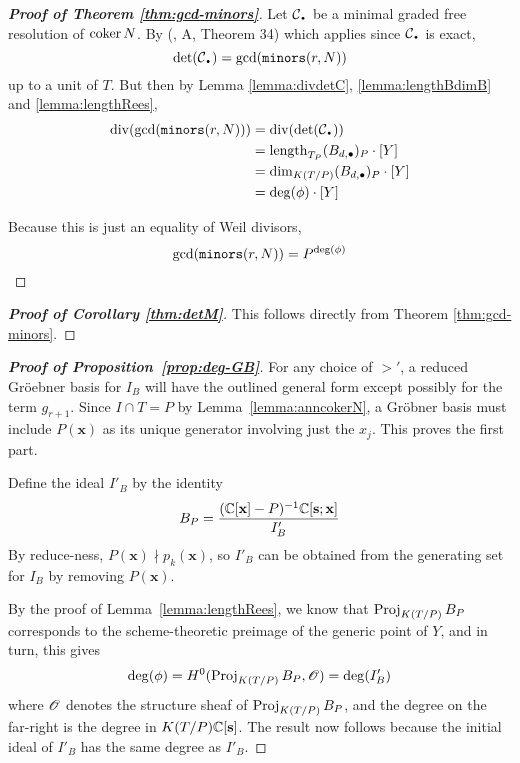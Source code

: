 \documentclass[fleqn,reqno]{amsart}
\begin{document}
\begin{proof}[\bf Proof of Theorem \ref{thm:gcd-minors}]
Let $\mathcal{C}_\nbul$ be a minimal graded free resolution of $\operatorname{coker} N$.
By (\citet{GKZ94}, A, Theorem 34) which applies since $\mathcal{C}_\nbul$ is exact,
\[
	\det(\mathcal{C}_\nbul)=\gcd(\mt{minors}(r,N))
\]
up to a unit of $T$. But then by Lemma \ref{lemma:divdetC}, \ref{lemma:lengthBdimB} and \ref{lemma:lengthRees},
\begin{align*}
\thediv(\gcd(\mt{minors}(r,N)))&=\thediv(\det(\mathcal{C}_\nbul))\\
&=\length_{T_P} (B_{d,\bullet})_P\cdot[Y]\\
&=\dim_{K(T/P)} (B_{d,\bullet})_P\cdot[Y]\\
&=\deg(\phi)\cdot[Y]
\end{align*}

Because this is just an equality of Weil divisors,
\[
\gcd(\mathop{\tt minors}(r,N))=P^{\deg(\phi)}\qedhere
\]
\end{proof}

\begin{proof}[\bf Proof of Corollary \ref{thm:detM}]
This follows directly from Theorem \ref{thm:gcd-minors}.
\end{proof}



\begin{proof}[\bf Proof of Proposition~\ref{prop:deg-GB}]
For any choice of $>'$, a reduced Gr\"oebner basis for $I_B$ will have the outlined general form
except possibly for the term $g_{r+1}$.
Since $I\cap T=P$ by Lemma~\ref{lemma:anncokerN},
a Gr\"obner basis must include $P(\mathbf x)$ as its unique generator involving just the $x_j$.
This proves the first part.

Define the ideal $I'_B$ by the identity
\[
	B_P=\frac{(\mathbb{C}[\mathbf x]-P)^{-1}\mathbb{C}[\mathbf s;\mathbf x]}{I'_B}
\]
By reduce-ness, $P(\mathbf x)\nmid p_k(\mathbf x)$,
so $I'_B$ can be obtained from the generating set for $I_B$ by removing $P(\mathbf x)$.

By the proof of Lemma~\ref{lemma:lengthRees},
we know that $\operatorname{Proj}_{K(T/P)} B_P$ corresponds to
the scheme-theoretic preimage of the generic point of $Y$,
and in turn, this gives
\[
	\deg(\phi)=H^0(\operatorname{Proj}_{K(T/P)} B_P,\mathscr{O})=\deg(I'_B)
\]
where $\mathscr{O}$ denotes the structure sheaf of $\operatorname{Proj}_{K(T/P)} B_P$,
and the degree on the far-right is the degree in $K(T/P)\mathbb{C}[\mathbf s]$.
The result now follows because the initial ideal of $I'_B$ has the same degree as $I'_B$.
\end{proof}





\end{document}
